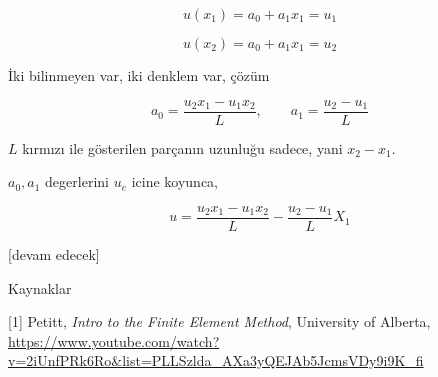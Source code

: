 \documentclass[12pt,fleqn]{article}\usepackage{../../common}
\begin{document}
$$
u(x_1) = a_0 + a_1 x_1 = u_1
$$

$$
u(x_2) = a_0 + a_1 x_1 = u_2
$$

İki bilinmeyen var, iki denklem var, çözüm

$$
a_0 = \frac{u_2 x_1 - u_1 x_2}{L}, \qquad a_1 = \frac{u_2 - u_1}{L}
$$

$L$ kırmızı ile gösterilen parçanın uzunluğu sadece, yani $x_2 - x_1$.

$a_0,a_1$ degerlerini $u_e$ icine koyunca,

$$
u = \frac{u_2 x_1 - u_1 x_2}{L} - \frac{u_2 - u_1}{L} X_1
$$








[devam edecek]

Kaynaklar

[1] Petitt, {\em Intro to the Finite Element Method}, University of Alberta,
    \url{https://www.youtube.com/watch?v=2iUnfPRk6Ro&list=PLLSzlda_AXa3yQEJAb5JcmsVDy9i9K_fi}
\end{document}
